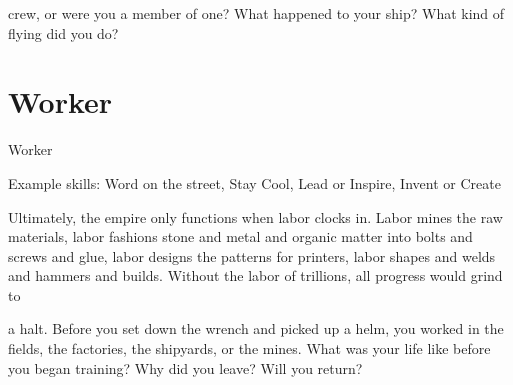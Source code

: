 crew, or were you a member of one? What happened to your ship? What kind of flying did you do?   
\section{Worker}
                                                      Worker  

Example skills: Word on the street, Stay Cool, Lead or Inspire, Invent or Create  

Ultimately, the empire only functions when labor clocks in. Labor mines the raw materials, labor fashions  
stone and metal and organic matter into bolts and screws and glue, labor designs the patterns for printers,  
labor shapes and welds and hammers and builds. Without the labor of trillions, all progress would grind to  

a halt. Before you set down the wrench and picked up a helm, you worked in the fields, the factories, the  
shipyards, or the mines. What was your life like before you began training? Why did you leave? Will you  
return?
 

                                                                                                                     
